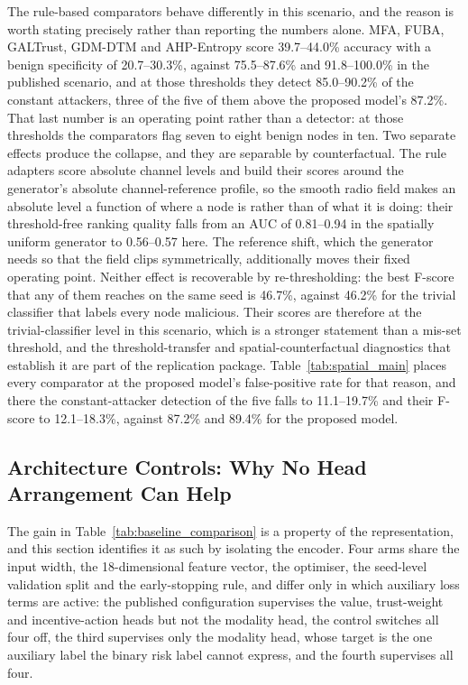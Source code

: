 \documentclass[notspecified,article,submit,moreauthors]{Definitions/mdpi}
\begin{document}
The rule-based comparators behave differently in this scenario, and the reason is worth stating precisely rather than reporting the numbers alone. MFA, FUBA, GALTrust, GDM-DTM and AHP-Entropy score 39.7--44.0\% accuracy with a benign specificity of 20.7--30.3\%, against 75.5--87.6\% and 91.8--100.0\% in the published scenario, and at those thresholds they detect 85.0--90.2\% of the constant attackers, three of the five of them above the proposed model's 87.2\%. That last number is an operating point rather than a detector: at those thresholds the comparators flag seven to eight benign nodes in ten. Two separate effects produce the collapse, and they are separable by counterfactual. The rule adapters score absolute channel levels and build their scores around the generator's absolute channel-reference profile, so the smooth radio field makes an absolute level a function of where a node is rather than of what it is doing: their threshold-free ranking quality falls from an AUC of 0.81--0.94 in the spatially uniform generator to 0.56--0.57 here. The reference shift, which the generator needs so that the field clips symmetrically, additionally moves their fixed operating point. Neither effect is recoverable by re-thresholding: the best F-score that any of them reaches on the same seed is 46.7\%, against 46.2\% for the trivial classifier that labels every node malicious. Their scores are therefore at the trivial-classifier level in this scenario, which is a stronger statement than a mis-set threshold, and the threshold-transfer and spatial-counterfactual diagnostics that establish it are part of the replication package. Table~\ref{tab:spatial_main} places every comparator at the proposed model's false-positive rate for that reason, and there the constant-attacker detection of the five falls to 11.1--19.7\% and their F-score to 12.1--18.3\%, against 87.2\% and 89.4\% for the proposed model.

\subsection{Architecture Controls: Why No Head Arrangement Can Help}
\label{sec:arch_controls}

The gain in Table~\ref{tab:baseline_comparison} is a property of the representation, and this section identifies it as such by isolating the encoder. Four arms share the input width, the 18-dimensional feature vector, the optimiser, the seed-level validation split and the early-stopping rule, and differ only in which auxiliary loss terms are active: the published configuration supervises the value, trust-weight and incentive-action heads but not the modality head, the control switches all four off, the third supervises only the modality head, whose target is the one auxiliary label the binary risk label cannot express, and the fourth supervises all four.
\end{document}
